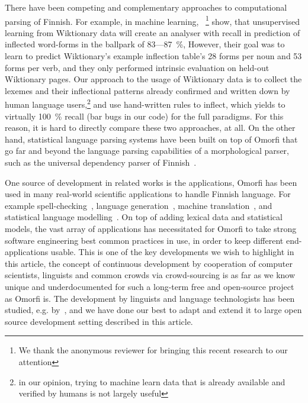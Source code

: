 \documentclass[preprint]{flammie}
\begin{document}
There have been competing and complementary approaches to computational
parsing of Finnish. For example, in machine learning,
~\citet{durrett2013supervised}\footnote{We thank the anonymous reviewer for
bringing this recent research to our attention} show, that unsupervised
learning from Wiktionary data will create an analyser with recall in
prediction of inflected word-forms in the ballpark of 83---87~\%, However,
their goal was to learn to predict Wiktionary's example inflection table's
28 forms per noun and 53 forms per verb, and they only performed intrinsic
evaluation on held-out Wiktionary pages. Our approach to the usage of Wiktionary
data is to collect the lexemes and their inflectional patterns already
confirmed and written down by human language users,\footnote{in our opinion,
trying to machine learn data that is already available and verified by
humans is not largely useful} and use hand-written rules to inflect, which
yields to virtually 100~\% recall (bar bugs in our code) for the full
paradigms. For this reason, it is hard to directly compare these two
approaches, at all. On the other hand, statistical language parsing systems
have been built on top of Omorfi that go far and beyond the language parsing
capabilities of a morphological parser, such as the universal dependency
parser of Finnish~\citep{pyysalo2015universal}.

One source of development in related works is the applications, Omorfi has been
used in many real-world scientific applications to handle Finnish language.
For example spell-checking~\citep{pirinen2014weighted}, language
generation~\citep{toivanen2012corpus}, machine
translation~\citep{clifton2011combining,rubino2015abumatran}, and statistical
language modelling~\citep{haverinen2013building,bohnet2013joint}.  On top of
adding lexical data and statistical models, the vast array of applications has
necessitated for Omorfi to take strong software engineering best common
practices in use, in order to keep different end-applications usable. This is
one of the key developments we wish to highlight in this article, the concept
of continuous development by cooperation of computer scientists, linguists and
common crowds via crowd-sourcing is as far as we know unique and
underdocumented for such a long-term free and open-source project as Omorfi is.
The development by linguists and language technologists has been studied, e.g.
by~\citet{maxwell2008joint}, and we have done our best to adapt and extend it
to large open source development setting described in this article.
\end{document}
